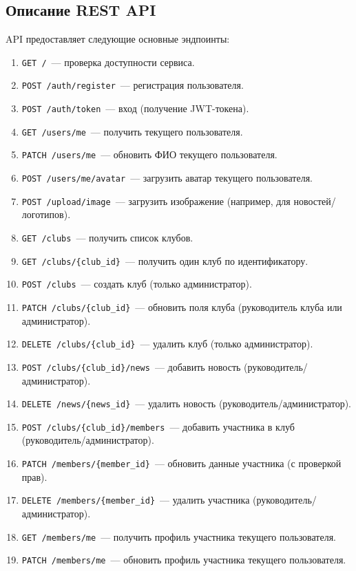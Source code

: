 \documentclass[utf8, russian]{eskdtext}
\begin{document}
\subsection{Описание REST API}
API предоставляет следующие основные эндпоинты:
\begin{enumerate}
  \item \texttt{GET /}~--- проверка доступности сервиса.
  \item \texttt{POST /auth/register}~--- регистрация пользователя.
  \item \texttt{POST /auth/token}~--- вход (получение JWT-токена).
  \item \texttt{GET /users/me}~--- получить текущего пользователя.
  \item \texttt{PATCH /users/me}~--- обновить ФИО текущего пользователя.
  \item \texttt{POST /users/me/avatar}~--- загрузить аватар текущего пользователя.
  \item \texttt{POST /upload/image}~--- загрузить изображение (например, для новостей/логотипов).
  \item \texttt{GET /clubs}~--- получить список клубов.
  \item \texttt{GET /clubs/\{club\_id\}}~--- получить один клуб по идентификатору.
  \item \texttt{POST /clubs}~--- создать клуб (только администратор).
  \item \texttt{PATCH /clubs/\{club\_id\}}~--- обновить поля клуба (руководитель клуба или администратор).
  \item \texttt{DELETE /clubs/\{club\_id\}}~--- удалить клуб (только администратор).
  \item \texttt{POST /clubs/\{club\_id\}/news}~--- добавить новость (руководитель/администратор).
  \item \texttt{DELETE /news/\{news\_id\}}~--- удалить новость (руководитель/администратор).
  \item \texttt{POST /clubs/\{club\_id\}/members}~--- добавить участника в клуб (руководитель/администратор).
  \item \texttt{PATCH /members/\{member\_id\}}~--- обновить данные участника (с проверкой прав).
  \item \texttt{DELETE /members/\{member\_id\}}~--- удалить участника (руководитель/администратор).
  \item \texttt{GET /members/me}~--- получить профиль участника текущего пользователя.
  \item \texttt{PATCH /members/me}~--- обновить профиль участника текущего пользователя.

\end{enumerate}
\end{document}
